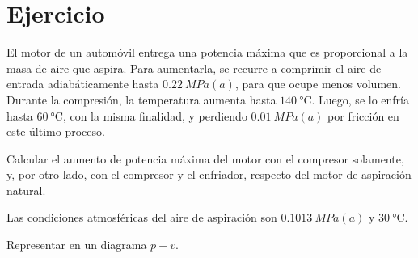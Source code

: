 \section{Ejercicio}\label{ej:Chap04Ejercicio19}

El motor de un automóvil entrega una potencia máxima que es proporcional a la masa de aire que aspira. Para aumentarla, se recurre a comprimir el aire de entrada adiabáticamente hasta $\SI{0.22}{MPa(a)}$, para que ocupe menos volumen. Durante la compresión, la temperatura aumenta hasta $\SI{140}{\celsius}$. Luego, se lo enfría hasta $\SI{60}{\celsius}$, con la misma finalidad, y perdiendo $\SI{0.01}{MPa(a)}$ por fricción en este último proceso.

Calcular el aumento de potencia máxima del motor con el compresor solamente, y, por otro lado, con el compresor y el enfriador, respecto del motor de aspiración natural.

Las condiciones atmosféricas del aire de aspiración son $\SI{0.1013}{MPa(a)}$ y $\SI{30}{\celsius}$.

Representar en un diagrama $p-v$.